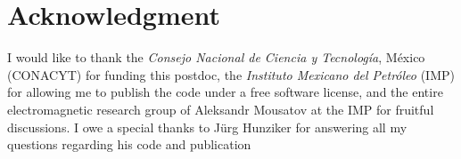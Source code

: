 \documentclass[manuscript,revised]{geophysics}
\begin{document}
\section{Acknowledgment}

I would like to thank the \emph{Consejo Nacional de Ciencia y Tecnología},
México (CONACYT) for funding this postdoc, the \emph{Instituto Mexicano del
Petróleo} (IMP) for allowing me to publish the code under a free software
license, and the entire electromagnetic research group of Aleksandr Mousatov at
the IMP for fruitful discussions.  I owe a special thanks to Jürg Hunziker for
answering all my questions regarding his code and publication
\end{document}
